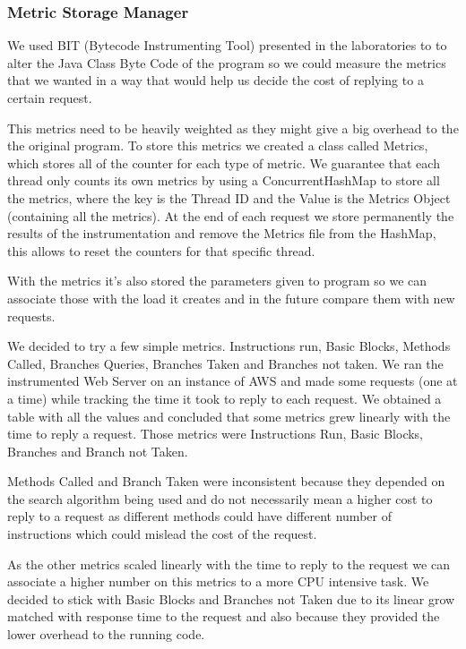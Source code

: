 \documentclass[times, 10pt,twocolumn]{article}
\begin{document}
\subsubsection{Metric Storage Manager}

   We used BIT (Bytecode Instrumenting Tool) presented in the laboratories to 
   to alter the Java Class Byte Code of the program so we could measure the metrics
   that we wanted in a way that would help us decide the cost of replying to a certain request.

   This metrics need to be heavily weighted as they might give a big overhead to the 
   the original program. To store this metrics we created a class called Metrics, which
   stores all of the counter for each type of metric. We guarantee that each thread only 
   counts its own metrics by using a ConcurrentHashMap to store all the metrics, where the 
   key is the Thread ID and the Value is the Metrics Object (containing all the metrics). At 
   the end of each request we store permanently the results of the instrumentation and remove
   the Metrics file from the HashMap, this allows to reset the counters for that specific thread.

   With the metrics it's also stored the parameters given to program so we can associate those with
   the load it creates and in the future compare them with new requests.


   We decided to try a few simple metrics. Instructions run, Basic Blocks, 
   Methods Called, Branches Queries, Branches Taken and Branches not taken. 
   We ran the instrumented Web Server on an instance of AWS and made some requests 
   (one at a time) while tracking the time it took to reply to each request.
   We obtained a table with all the values and concluded that some metrics grew
   linearly with the time to reply a request. Those metrics were Instructions
   Run, Basic Blocks, Branches and Branch not Taken.

   Methods Called and Branch Taken were inconsistent because they depended on 
   the search algorithm being used and do not necessarily mean a higher cost to 
   reply to a request as different methods could have different number of instructions
   which could mislead the cost of the request.

   As the other metrics scaled linearly with the time to reply to the request we can
   associate a higher number on this metrics to a more CPU intensive task.
   We decided to stick with Basic Blocks and Branches not Taken due to its 
   linear grow matched with response time to the request and also because they provided
   the lower overhead to the running code. 
\end{document}
